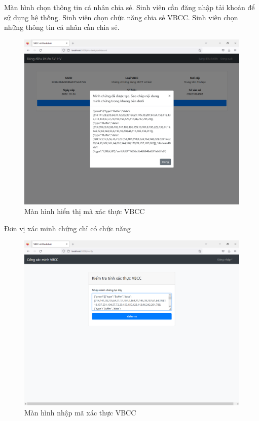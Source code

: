 Màn hình chọn thông tin cá nhân chia sẻ.
Sinh viên cần đăng nhập tải khoản để sử dụng hệ thống.
Sinh viên chọn chức năng chia sẻ VBCC.
Sinh viên chọn những thông tin cá nhân cần chia sẻ.
\begin{figure}[H]
\centering
\includegraphics[width=.9\linewidth]{img/sv_minhchung.PNG}
\caption{Màn hình hiển thị mã xác thực VBCC}
\label{fig:sv_minhchung}
\end{figure}

Đơn vị xác minh chứng chỉ có chức năng

\begin{figure}[H]
\centering
\includegraphics[width=.9\linewidth]{img/v_begin.PNG}
\caption{Màn hình nhập mã xác thực VBCC}
\label{fig:v_begin}
\end{figure}


